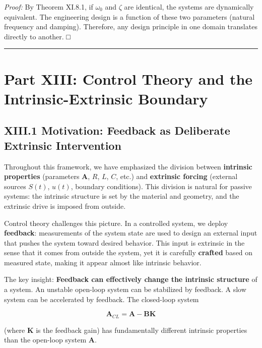 \documentclass[
]{article}
\begin{document}
\emph{Proof:} By Theorem XI.8.1, if \(\omega_0\) and \(\zeta\) are
identical, the systems are dynamically equivalent. The engineering
design is a function of these two parameters (natural frequency and
damping). Therefore, any design principle in one domain translates
directly to another. □

\begin{center}\rule{0.5\linewidth}{0.5pt}\end{center}

\section{Part XIII: Control Theory and the Intrinsic-Extrinsic
Boundary}\label{part-xiii-control-theory-and-the-intrinsic-extrinsic-boundary}

\subsection{XIII.1 Motivation: Feedback as Deliberate Extrinsic
Intervention}\label{xiii.1-motivation-feedback-as-deliberate-extrinsic-intervention}

Throughout this framework, we have emphasized the division between
\textbf{intrinsic properties} (parameters \(\mathbf{A}\), \(R\), \(L\),
\(C\), etc.) and \textbf{extrinsic forcing} (external sources \(S(t)\),
\(u(t)\), boundary conditions). This division is natural for passive
systems: the intrinsic structure is set by the material and geometry,
and the extrinsic drive is imposed from outside.

Control theory challenges this picture. In a controlled system, we
deploy \textbf{feedback}: measurements of the system state are used to
design an external input that pushes the system toward desired behavior.
This input is extrinsic in the sense that it comes from outside the
system, yet it is carefully \textbf{crafted} based on measured state,
making it appear almost like intrinsic behavior.

The key insight: \textbf{Feedback can effectively change the intrinsic
structure} of a system. An unstable open-loop system can be stabilized
by feedback. A slow system can be accelerated by feedback. The
closed-loop system

\[\mathbf{A}_{CL} = \mathbf{A} - \mathbf{BK}\]

(where \(\mathbf{K}\) is the feedback gain) has fundamentally different
intrinsic properties than the open-loop system \(\mathbf{A}\).
\end{document}
